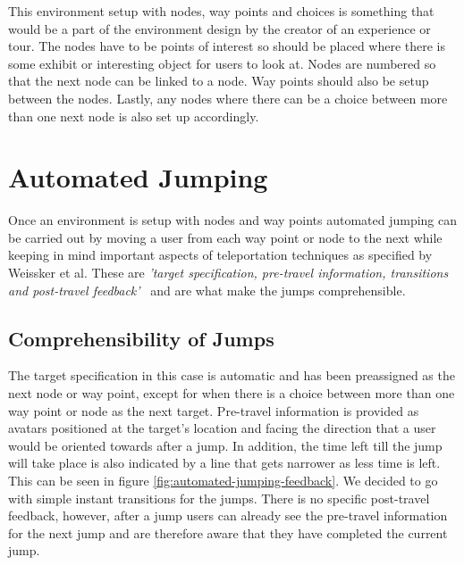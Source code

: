 This environment setup with nodes, way points and choices is something that would be a part of the environment design by the creator of an experience or tour. The nodes have to be points of interest so should be placed where there is some exhibit or interesting object for users to look at. Nodes are numbered so that the next node can be linked to a node. Way points should also be setup between the nodes. Lastly, any nodes where there can be a choice between more than one next node is also set up accordingly.
 
\section{Automated Jumping}
\label{section AGJ: Automated Jumping}
Once an environment is setup with nodes and way points automated jumping can be carried out by moving a user from each way point or node to the next while keeping in mind important aspects of teleportation techniques as specified by Weissker et al. These are \textit{'target specification, pre-travel information, transitions and post-travel feedback'}~\cite{Weissker2018} and are what make the jumps comprehensible.

\subsection{Comprehensibility of Jumps}
\label{subsection AGJ AJ: Comprehensibility of Jumps}
The target specification in this case is automatic and has been preassigned as the next node or way point, except for when there is a choice between more than one way point or node as the next target. Pre-travel information is provided as avatars positioned at the target's location and facing the direction that a user would be oriented towards after a jump. In addition, the time left till the jump will take place is also indicated by a line that gets narrower as less time is left. This can be seen in figure \ref{fig:automated-jumping-feedback}. We decided to go with simple instant transitions for the jumps. There is no specific post-travel feedback, however, after a jump users can already see the pre-travel information for the next jump and are therefore aware that they have completed the current jump. 

